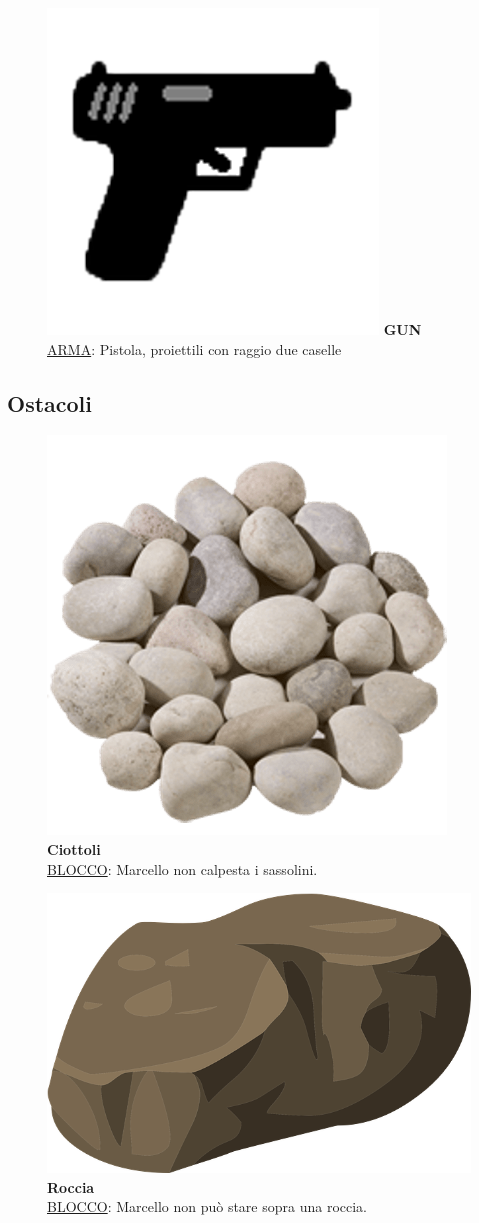 \documentclass[a4paper,titlepage,12pt]{article}
\begin{document}
\begin{itemize}
    \begin{figure}[H]
		\item[\textbf{ }]
		\includegraphics[width=0.05\linewidth]{img/rsc/Gun}
		\label{img:Gun}
		\textbf{GUN}\\
        \underline{ARMA}: Pistola, proiettili con raggio due caselle
    \end{figure}
\end{itemize}

\subsection*{Ostacoli}
\begin{itemize}
    \begin{figure}[H]
		\item[\textbf{ }]
		\includegraphics[width=0.05\linewidth]{img/rsc/Pebble.png}
		\label{img: Pebble}
		\textbf{Ciottoli}\\
        \underline{BLOCCO}: Marcello non calpesta i sassolini.
    \end{figure}
    
    \begin{figure}[H]
		\item[\textbf{ }]
		\includegraphics[width=0.05\linewidth]{img/rsc/Rock.png}
		\label{img: Rock}
		\textbf{Roccia}\\
        \underline{BLOCCO}: Marcello non può stare sopra una roccia.
    \end{figure}
\end{itemize}
\end{document}

